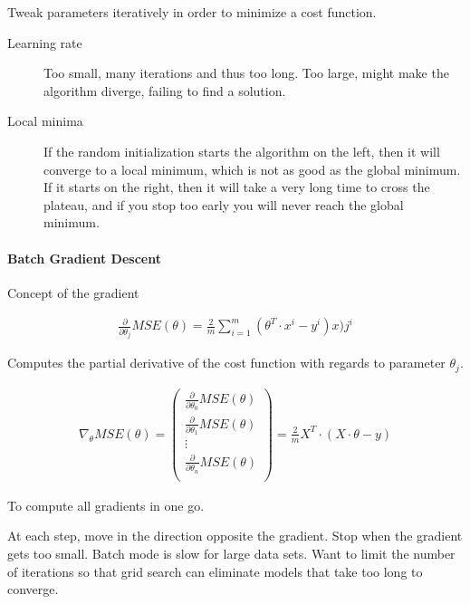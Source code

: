 \documentclass[10pt]{article}
\begin{document}
  Tweak parameters iteratively in order to minimize a cost function.

  \begin{description}
    \item[Learning rate] Too small, many iterations and thus too long. Too large,
      might make the algorithm diverge, failing to find a solution.
    \item[Local minima] If the random initialization starts the algorithm on the
      left, then it will converge to a local minimum, which is not as good as the
      global minimum. If it starts on the right, then it will take a very long
      time to cross the plateau, and if you stop too early you will never reach
      the global minimum.
  \end{description}

  \paragraph{Batch Gradient Descent}%
  \label{par:batch_gradient_descent}

  Concept of the gradient

  \begin{align}
    \frac{\partial}{\partial \theta_j}MSE(\theta)
    =\frac{2}{m}\sum_{i=1}^{m}\left(\theta^T\cdot x^i-y^i\right)x)j^i
  \end{align}

  Computes the partial derivative of the cost function with regards to parameter
  \(\theta_j\).

  \begin{align}
    \nabla_\theta MSE(\theta)=\begin{pmatrix}
      \frac{\partial}{\partial \theta_0}MSE(\theta)\\
      \frac{\partial}{\partial \theta_1}MSE(\theta)\\
      \vdots \\
      \frac{\partial}{\partial \theta_n}MSE(\theta)\\
    \end{pmatrix}=\frac{2}{m}X^T\cdot (X\cdot\theta-y)
  \end{align}

  To compute all gradients in one go.

  At each step, move in the direction opposite the gradient. Stop when the
  gradient gets too small. Batch mode is slow for large data sets. Want to limit
  the number of iterations so that grid search can eliminate models that take too
  long to converge.
\end{document}
